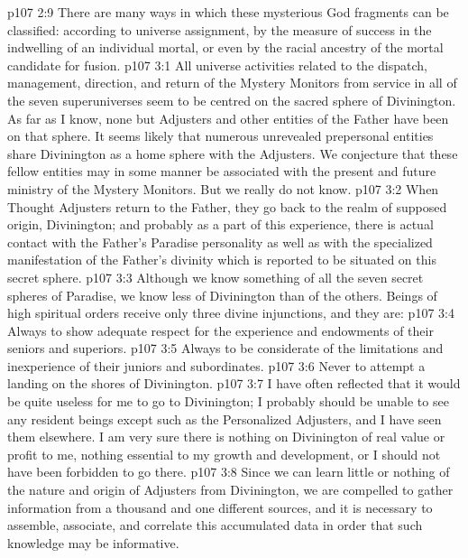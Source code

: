 \vs p107 2:9 \pc There are many ways in which these mysterious God fragments can be classified: according to universe assignment, by the measure of success in the indwelling of an individual mortal, or even by the racial ancestry of the mortal candidate for fusion.
\vs p107 3:1 All universe activities related to the dispatch, management, direction, and return of the Mystery Monitors from service in all of the seven superuniverses seem to be centred on the sacred sphere of Divinington. As far as I know, none but Adjusters and other entities of the Father have been on that sphere. It seems likely that numerous unrevealed prepersonal entities share Divinington as a home sphere with the Adjusters. We conjecture that these fellow entities may in some manner be associated with the present and future ministry of the Mystery Monitors. But we really do not know.
\vs p107 3:2 When Thought Adjusters return to the Father, they go back to the realm of supposed origin, Divinington; and probably as a part of this experience, there is actual contact with the Father’s Paradise personality as well as with the specialized manifestation of the Father’s divinity which is reported to be situated on this secret sphere.
\vs p107 3:3 Although we know something of all the seven secret spheres of Paradise, we know less of Divinington than of the others. Beings of high spiritual orders receive only three divine injunctions, and they are:
\vs p107 3:4 \bibnobreakspace Always to show adequate respect for the experience and endowments of their seniors and superiors.
\vs p107 3:5 \bibnobreakspace Always to be considerate of the limitations and inexperience of their juniors and subordinates.
\vs p107 3:6 \bibnobreakspace Never to attempt a landing on the shores of Divinington.
\vs p107 3:7 I have often reflected that it would be quite useless for me to go to Divinington; I probably should be unable to see any resident beings except such as the Personalized Adjusters, and I have seen them elsewhere. I am very sure there is nothing on Divinington of real value or profit to me, nothing essential to my growth and development, or I should not have been forbidden to go there.
\vs p107 3:8 Since we can learn little or nothing of the nature and origin of Adjusters from Divinington, we are compelled to gather information from a thousand and one different sources, and it is necessary to assemble, associate, and correlate this accumulated data in order that such knowledge may be informative.
